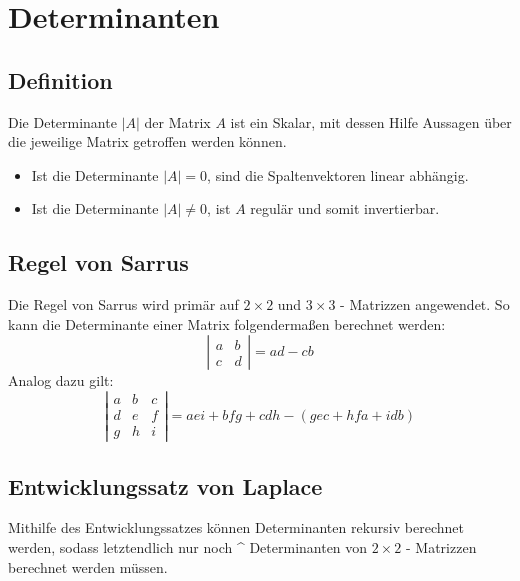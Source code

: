 
\section{Determinanten}
\label{sec:determinanten}

\subsection{Definition}
\label{sub:definition}

Die Determinante $|A|$ der Matrix $A$ ist ein Skalar, mit dessen Hilfe Aussagen über die jeweilige Matrix getroffen
werden können.
\begin{itemize}
	\item Ist die Determinante $|A| = 0$, sind die Spaltenvektoren linear abhängig.
	\item Ist die Determinante $|A| \neq 0$, ist $A$ regulär und somit invertierbar.
\end{itemize}

\subsection{Regel von Sarrus}
\label{sub:regel_von_sarrus}

Die Regel von Sarrus wird primär auf $2 \times 2$ und $3 \times 3$ - Matrizzen angewendet. So kann die Determinante
einer Matrix folgendermaßen berechnet werden: 
\begin{displaymath}
	\left| \begin{matrix}a & b \\ c & d\end{matrix}\right| = ad - cb
\end{displaymath}
Analog dazu gilt:
\begin{displaymath}
	\left| \begin{matrix}a & b & c \\ d & e & f \\ g & h & i \end{matrix} \right| = aei + bfg + cdh - (gec + hfa + idb)
\end{displaymath}

\subsection{Entwicklungssatz von Laplace}
\label{sub:entwicklungssatz_von_laplace}
Mithilfe des Entwicklungssatzes können Determinanten rekursiv berechnet werden, sodass letztendlich nur noch ^
Determinanten von $2 \times 2$ - Matrizzen berechnet werden müssen.
